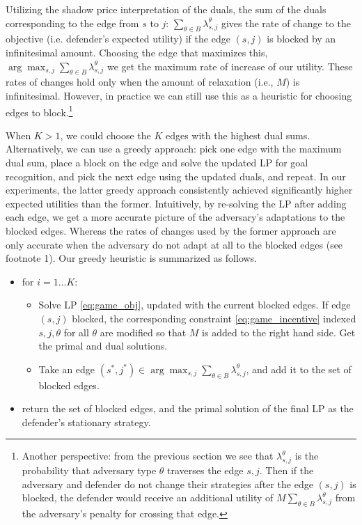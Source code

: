 Utilizing the shadow price interpretation of the duals, the sum of the duals corresponding to the 
edge from $s$ to $j$: 
$\sum_{\theta\in B} \lambda^\theta_{s,j}$
 gives the rate of change to the objective (i.e. defender's expected utility) if the edge $(s,j)$ is blocked by an infinitesimal amount.
 Choosing the edge that maximizes this,
 $\arg \max_{s,j}\sum_{\theta\in B} \lambda^\theta_{s,j}$
 we get the maximum rate of increase of our utility.
 These rates of changes hold only when the amount of relaxation (i.e., $M$) is infinitesimal. However,
 in practice we can still use this as a heuristic for choosing edges to block.\footnote{Another perspective: from the previous section we see that $\lambda^\theta_{s,j}$ is the probability that adversary type $\theta$ traverses the edge $s,j$. 
 Then if the adversary and defender do not change their strategies after the edge $(s,j)$ is blocked, the defender would receive an additional utility of 
 $M\sum_{\theta\in B} \lambda^\theta_{s,j}$ from the adversary's penalty for crossing that edge.}

When $K > 1$, we could choose the $K$ edges with the highest dual sums.
 Alternatively, we can use a greedy approach:
pick one edge  with the maximum dual sum, 
place a block on the edge and solve the updated LP for goal recognition, and pick the next edge using the updated duals, and repeat.
In our experiments, the latter greedy approach consistently achieved significantly higher expected utilities than the former.
Intuitively, by re-solving the LP after adding each edge,
we get a more accurate picture of the adversary's 
adaptations to the blocked edges.
Whereas the rates of changes used by the former approach are only accurate when the adversary do not adapt at all to the blocked edges (see footnote 1).
Our greedy heuristic is summarized as follows.
\begin{itemize} 

\item for $i=1 \ldots K$:
\begin{itemize}
\item Solve LP \eqref{eq:game_obj}, updated with the current blocked edges. If edge $(s,j)$ blocked, the corresponding constraint \eqref{eq:game_incentive} indexed $s,j,\theta$ for all $\theta$ are modified so that $M$ is added to the right hand side.
Get the primal and dual solutions.
\item Take an edge $(s^*,j^*) \in\arg \max_{s,j}\sum_{\theta\in B} \lambda^\theta_{s,j}$,
and add it to the set of blocked edges.


\end{itemize}
\item return the set of blocked edges, and the primal solution of the final LP as the defender's stationary strategy. 
\end{itemize}
\nocite{Dijkstra80}
\nocite{plop03-paper}
